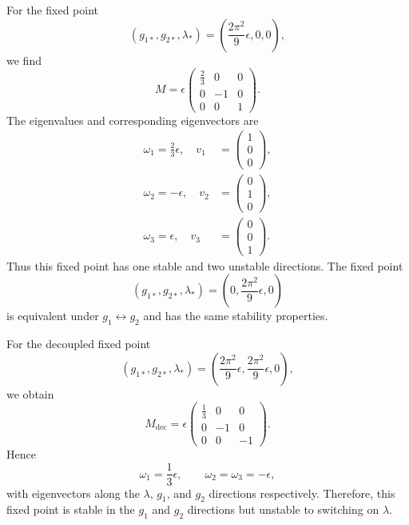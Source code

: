 \begin{solution}
For the fixed point
\begin{equation}
(g_{1*},g_{2*},\lambda_*)
=
\left(\frac{2\pi^2}{9}\epsilon,0,0\right),
\end{equation}
we find
\begin{equation}
M=\epsilon
\begin{pmatrix}
\frac23&0&0\\
0&-1&0\\
0&0&1
\end{pmatrix}.
\end{equation}
The eigenvalues and corresponding eigenvectors are
\begin{align}
\omega_1=\frac23\epsilon,\quad
v_1&=
\begin{pmatrix}1\\0\\0\end{pmatrix},
\\
\omega_2=-\epsilon,\quad
v_2&=
\begin{pmatrix}0\\1\\0\end{pmatrix},
\\
\omega_3=\epsilon,\quad
v_3&=
\begin{pmatrix}0\\0\\1\end{pmatrix}.
\end{align}
Thus this fixed point has one stable and two unstable directions. The fixed point
\begin{equation}
(g_{1*},g_{2*},\lambda_*)
=
\left(0,\frac{2\pi^2}{9}\epsilon,0\right)
\end{equation}
is equivalent under $g_1\leftrightarrow g_2$ and has the same stability properties.

For the decoupled fixed point
\begin{equation}
(g_{1*},g_{2*},\lambda_*)
=
\left(
\frac{2\pi^2}{9}\epsilon,
\frac{2\pi^2}{9}\epsilon,
0
\right),
\end{equation}
we obtain
\begin{equation}
M_{\mathrm{dec}}
=
\epsilon
\begin{pmatrix}
\frac13&0&0\\
0&-1&0\\
0&0&-1
\end{pmatrix}.
\end{equation}
Hence
\begin{equation}
\omega_1=\frac13\epsilon,
\qquad
\omega_2=\omega_3=-\epsilon,
\end{equation}
with eigenvectors along the $\lambda$, $g_1$, and $g_2$ directions respectively. Therefore, this fixed point is stable in the $g_1$ and $g_2$ directions but unstable to switching on $\lambda$.


\end{solution}
